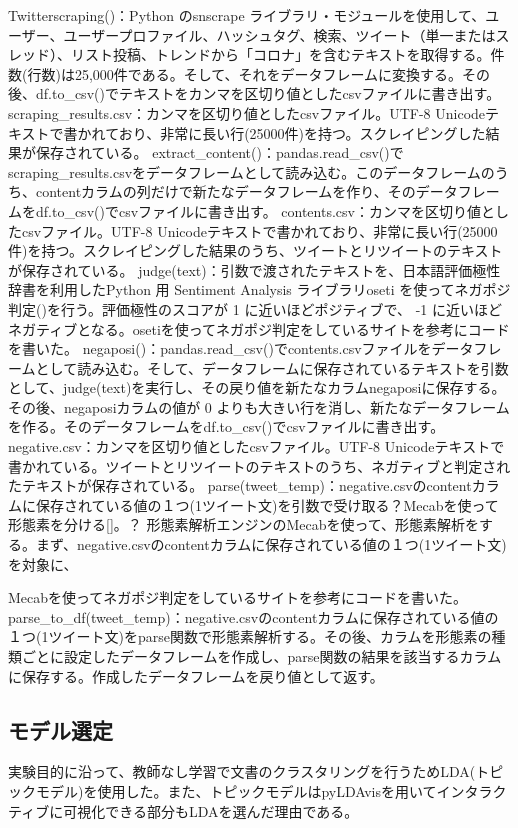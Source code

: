 \documentclass[a4paper, 11pt, titlepage]{jsarticle}
\begin{document}
Twitterscraping()：Python のsnscrape ライブラリ・モジュールを使用して、ユーザー、ユーザープロファイル、ハッシュタグ、検索、ツイート（単一またはスレッド）、リスト投稿、トレンドから「コロナ」を含むテキストを取得する。件数(行数)は25,000件である。そして、それをデータフレームに変換する\cite{snscrape1}。その後、df.to_csv()でテキストをカンマを区切り値としたcsvファイルに書き出す\cite{snscrape2}。
scraping_results.csv：カンマを区切り値としたcsvファイル。UTF-8 Unicodeテキストで書かれており、非常に長い行(25000件)を持つ。スクレイピングした結果が保存されている。
extract_content()：pandas.read_csv()でscraping_results.csvをデータフレームとして読み込む\cite{snscrape3}。このデータフレームのうち、contentカラムの列だけで新たなデータフレームを作り、そのデータフレームをdf.to_csv()でcsvファイルに書き出す。
contents.csv：カンマを区切り値としたcsvファイル。UTF-8 Unicodeテキストで書かれており、非常に長い行(25000件)を持つ。スクレイピングした結果のうち、ツイートとリツイートのテキストが保存されている。
judge(text)：引数で渡されたテキストを、日本語評価極性辞書を利用したPython 用 Sentiment Analysis ライブラリoseti を使ってネガポジ判定()を行う\cite{negaposi1}。評価極性のスコアが 1 に近いほどポジティブで、 -1 に近いほどネガティブとなる。osetiを使ってネガポジ判定をしているサイトを参考にコードを書いた\cite{negaposi2}。
negaposi()：pandas.read_csv()でcontents.csvファイルをデータフレームとして読み込む。そして、データフレームに保存されているテキストを引数として、judge(text)を実行し、その戻り値を新たなカラムnegaposiに保存する。その後、negaposiカラムの値が 0 よりも大きい行を消し、新たなデータフレームを作る。そのデータフレームをdf.to_csv()でcsvファイルに書き出す。
negative.csv：カンマを区切り値としたcsvファイル。UTF-8 Unicodeテキストで書かれている。ツイートとリツイートのテキストのうち、ネガティブと判定されたテキストが保存されている。
parse(tweet_temp)：negative.csvのcontentカラムに保存されている値の１つ(1ツイート文)を引数で受け取る？Mecabを使って形態素を分ける[]。？
形態素解析エンジンのMecabを使って、形態素解析をする\cite{keitaiso1}。まず、negative.csvのcontentカラムに保存されている値の１つ(1ツイート文)を対象に、

Mecabを使ってネガポジ判定をしているサイトを参考にコードを書いた\cite{keitaiso2}。
parse_to_df(tweet_temp)：negative.csvのcontentカラムに保存されている値の１つ(1ツイート文)をparse関数で形態素解析する。その後、カラムを形態素の種類ごとに設定したデータフレームを作成し、parse関数の結果を該当するカラムに保存する。作成したデータフレームを戻り値として返す。

\subsection{モデル選定}
実験目的に沿って、教師なし学習で文書のクラスタリングを行うためLDA(トピックモデル)を使用した。また、トピックモデルはpyLDAvisを用いてインタラクティブに可視化できる部分もLDAを選んだ理由である。 
\end{document}
